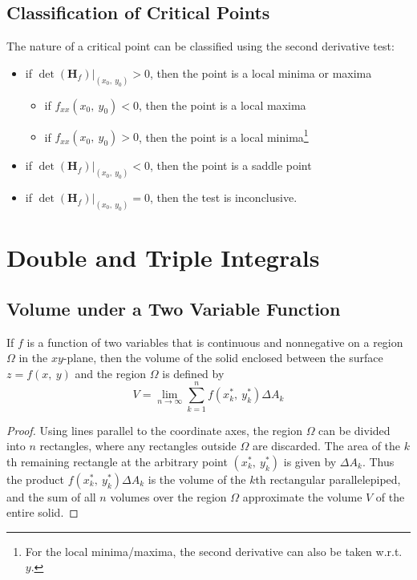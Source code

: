 \documentclass{article}
\begin{document}
\subsection{Classification of Critical Points}
The nature of a critical point can be classified using the second
derivative test:
\begin{itemize}
    \item if \(\left.\det{\left(\mathbf{H}_f\right)}\right|_{(x_0,\:
          y_0)} > 0\), then the point is a local minima or maxima
          \begin{itemize}
              \item if \(f_{xx}\left( x_0, \: y_0 \right) < 0\), then
                    the point is a local maxima
              \item if \(f_{xx}\left( x_0, \: y_0 \right) > 0\), then
                    the point is a local minima\footnote{For the local
                    minima/maxima, the second derivative can also be
                    taken w.r.t. \(y\).}
          \end{itemize}
    \item if \(\left.\det{\left(\mathbf{H}_f\right)}\right|_{(x_0,\:
          y_0)} < 0\), then the point is a saddle point
    \item if \(\left.\det{\left(\mathbf{H}_f\right)}\right|_{(x_0,\:
          y_0)} = 0\), then the test is inconclusive.
\end{itemize}
\newpage
\section{Double and Triple Integrals}
\subsection{Volume under a Two Variable Function}
\begin{definition}
    If \(f\) is a function of two variables that is continuous and
    nonnegative on a region \(\Omega\) in the \(xy\)-plane, then the
    volume of the solid enclosed between the surface \(z=f\left( x,\: y \right)\) and
    the region \(\Omega\) is defined by
    \begin{equation}
        \label{eq:volume_under_2d_function}
        V = \lim_{n \to \infty} \sum_{k = 1}^n f\left( x_k^\ast,\: y_k^\ast \right) \Delta A_k
    \end{equation}
\end{definition}
\begin{proof}
    Using lines parallel to the coordinate axes, the region \(\Omega\)
    can be divided into \(n\) rectangles, where any rectangles outside
    \(\Omega\) are discarded. The area of the \(k\)th remaining
    rectangle at the arbitrary point \(\left( x_k^\ast,\: y_k^\ast \right)\) is given
    by \(\Delta A_k\). Thus the product
    \(f\left( x_k^\ast,\: y_k^\ast \right)\Delta A_k\) is the volume of the \(k\)th
    rectangular parallelepiped, and the sum of all \(n\) volumes over
    the region \(\Omega\) approximate the volume \(V\) of the entire
    solid.
\end{proof}
\end{document}
